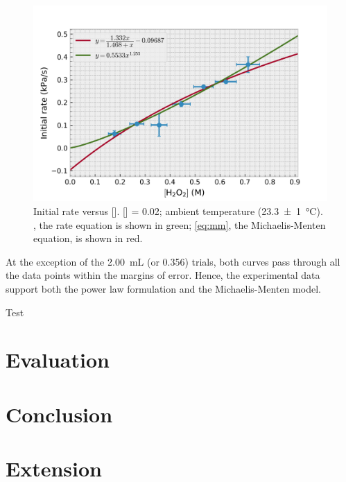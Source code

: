 \documentclass[a4paper, 12pt]{article}
\begin{document}
\begin{figure}[H]
    \centering
    \includegraphics[width=\textwidth]{data/processed_data}
    \caption{Initial rate versus []. [] = \SI{0.02}{\molar}; ambient temperature (\SI{23.3(10)}{\celsius}). , the rate equation is shown in green; \cref{eq:mm}, the Michaelis-Menten equation, is shown in red. }
    \label{fig:processed-data}
\end{figure}

At the exception of the \SI{2.00}{\mL} (or \SI{0.356}{\molar})  trials, both curves pass through all the data points within the margins of error. Hence, the experimental data support both the power law formulation and the Michaelis-Menten model.

Test \cite{mathematical_biology}
\cite{tachiev}
\cite{de_laat}

\section*{Evaluation}

\section*{Conclusion}

\section*{Extension}

\printbibliography
\end{document}
